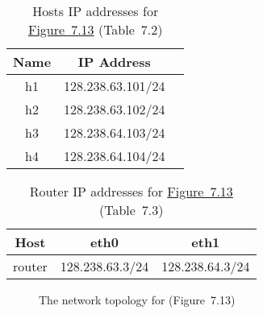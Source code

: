 \documentclass{../UTNetLab}
\begin{document}
    \begin{table}[H]
        \caption{Hosts IP addresses for \hyperref[fig:7.13]{Figure~7.13} (Table~7.2)}
        \label{tab:7.2}
        \centering
        \begin{tabular}{ *3c }
            \hline \hline
            Name & IP Address \\
            \hline
                h1 & 128.238.63.101/24 \\
                h2 & 128.238.63.102/24 \\
                h3 & 128.238.64.103/24 \\
                h4 & 128.238.64.104/24 \\
            \hline \hline
            \end{tabular}
    \end{table}

    \begin{table}[H]
        \caption{Router IP addresses for \hyperref[fig:7.13]{Figure~7.13} (Table~7.3)}
        \label{tab:7.3}
        \centering
        \begin{tabular}{ *3c }
            \hline \hline
            Host & eth0 & eth1 \\
            \hline
            router & 128.238.63.3/24 & 128.238.64.3/24 \\
            \hline \hline
            \end{tabular}
    \end{table}

    \begin{figure}[H]
        \centering
        \caption{The network topology for  (Figure~7.13)}
        \label{fig:7.13}
    \end{figure}
\end{document}
